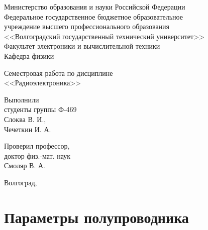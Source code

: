 \documentclass[14pt,a4paper]{extarticle}
\begin{document}
  \begin{titlepage}
    \singlespacing
    \begin{center}
      Министерство образования и науки Российской Федерации \\
      Федеральное государственное бюджетное образовательное \\
      учреждение высшего профессионального образования \\
      <<Волгоградский государственный технический университет>> \\
      Факультет электроники и вычислительной техники \\
      Кафедра физики
    \end{center}

    \vspace{9em}

    \begin{center}
      \large Семестровая работа по дисциплине \\
      <<Радиоэлектроника>>
    \end{center}

    \vspace{5em}

    \begin{flushright}
      \begin{minipage}{.40\textwidth}
        Выполнили \\
        студенты группы Ф-469 \\
        Слоква В. И., \\
        Чечеткин И. А. \\

        \vspace{1em}

        Проверил профессор, \\
        доктор физ.-мат. наук \\
        Смоляр В. А.
      \end{minipage}
    \end{flushright}

    \vspace{\fill}

    \begin{center}
      Волгоград, \the\year
    \end{center}
  \end{titlepage}

  \setcounter{page}{2}
  \tableofcontents
  \newpage

  \section*{Параметры полупроводника}
\end{document}
